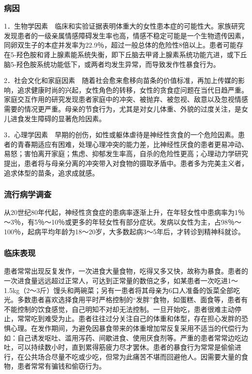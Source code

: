 \subsubsection{病因}

1．生物学因素　临床和实验证据表明体重大的女性患本症的可能性大。家族研究发现患者的一级亲属情感障碍发生率也高，情感不稳定可能是一个生物遗传因素，同卵双生子的本症并发率为22.9％，超过一般总体的危险性8倍以上。患者可能存在5-羟色胺和肾上腺素能系统失衡，即下丘脑去甲肾上腺素系统功能亢进，或下丘脑5-羟色胺系统功能低下，或两者均发生异常，而导致发作性暴食行为。

2．社会文化和家庭因素　随着社会愈来愈移向苗条的价值标准，再加上传媒的影响，追求健康时尚的兴起，女性角色的转移，女性的贪食症问题在当代日趋严重。家庭交互作用的研究发现患者家庭中的冲突、被抛弃、被忽视、敌意以及忽视情感需要的情况更严重。母亲的节食行为，尤其是对女儿体重、外貌的过度关注，是女儿进食发生障碍的显著危险因素。

3．心理学因素　早期的创伤，如性或躯体虐待是神经性贪食的一个危险因素。患者的青春期适应有困难，处理心理冲突的能力差，比神经性厌食的患者更易冲动、易怒；害怕离开家庭；焦虑、抑郁发生率高，自杀的危险性更高；心理动力学研究提出，患者将与母亲分离的冲突带入对食物的摄取矛盾中。患者多为完美主义者，追求体型的苗条，追求成就感。

\subsubsection{流行病学调查}

从20世纪80年代起，神经性贪食症的患病率逐渐上升，在年轻女性中患病率为1％～3％，有5％～10％或更多的年轻女性有部分症状。发病以女性为主，占98％～100％，起病平均年龄为18～20岁，大多数起病3～5年后，才转诊到精神科就诊。

\subsubsection{临床表现}

患者常常出现反复发作，一次进食大量食物，吃得又多又快，故称为暴食。患者的一次进食量远远超过正常人，可达到正常量的数倍之多，如某患者一次吃进1～1.5kg（2～3斤）馒头和两碗菜；另有一患者将其母亲为6口人准备的饭菜全部吃光。多数患者喜欢选择食用平时严格控制的“发胖”食物，如蛋糕、面食等，患者有不能控制的饮食感觉，自己明知不对却无法控制。一旦开始吃，患者很难主动停止，常常吃到难受为止。患者往往过分关注自己的体重和体型，存在担心发胖的恐惧心理。在发作期间，为避免因暴食带来的体重增加常反复采用不适当的代偿行为如：自己诱发呕吐、滥用泻药、间歇进食、使用厌食剂等。严重的患者常常边吃边吐，可以持续数小时，直到累得筋疲力尽才罢休。患者的暴食行为常常是偷偷进行，在公共场合尽量不吃或少吃，但常为此痛苦不堪而回避他人。因需要大量的食物，患者常常有骗钱和偷窃行为。

